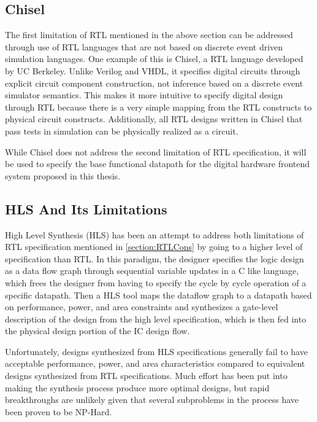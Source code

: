 \subsection{Chisel}
The first limitation of RTL mentioned in the above section can be addressed through use of RTL languages that are not based on discrete event driven simulation languages. One example of this is Chisel\cite{Bachrach:2012}, a RTL language developed by UC Berkeley. Unlike Verilog and VHDL, it specifies digital circuits through explicit circuit component construction, not inference based on a discrete event simulator semantics. This makes it more intuitive to specify digital design through RTL because there is a very simple mapping from the RTL constructs to physical circuit constructs. Additionally, all RTL designs written in Chisel that pass tests in simulation can be physically realized as a circuit.

While Chisel does not address the second limitation of RTL specification, it will be used to specify the base functional datapath for the digital hardware frontend system proposed in this thesis.

\subsection{HLS And Its Limitations}
High Level Synthesis (HLS) has been an attempt to address both limitations of RTL specification mentioned in \ref{section:RTLCons} by going to a higher level of specification than RTL. In this paradigm, the designer specifies the logic design as a data flow graph through sequential variable updates in a C like language, which frees the designer from having to specify the cycle by cycle operation of a specific datapath. Then a HLS tool maps the dataflow graph to a datapath based on performance, power, and area constraints and synthesizes a gate-level description of the design from the high level specification, which is then fed into the physical design portion of the IC design flow. 

Unfortunately, designs synthesized from HLS specifications generally fail to have acceptable performance, power, and area characteristics compared to equivalent designs synthesized from RTL specifications. Much effort has been put into making the synthesis process produce more optimal designs, but rapid breakthroughs are unlikely given that several subproblems in the process have been proven to be NP-Hard\cite{McFarlan:1990}.
